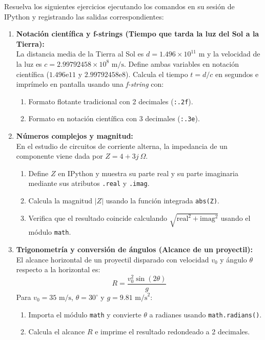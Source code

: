\documentclass[12pt]{article}
\begin{document}
\begin{problemas}[]
	Resuelva los siguientes ejercicios ejecutando los comandos en su sesión de IPython y registrando las salidas correspondientes:

\begin{enumerate}[leftmargin=*]

    \item \textbf{Notación científica y f-strings (Tiempo que tarda la luz del Sol a la Tierra):} \\
    La distancia media de la Tierra al Sol es $d = 1.496 \times 10^{11}\text{ m}$ y la velocidad de la luz es $c = 2.99792458 \times 10^8\text{ m/s}$. 
    Define ambas variables en notación científica ($1.496\text{e}11$ y $2.99792458\text{e}8$). Calcula el tiempo $t = d / c$ en segundos e imprímelo en pantalla usando una \textit{f-string} con:
    \begin{enumerate}
        \item Formato flotante tradicional con 2 decimales (\texttt{:.2f}).
        \item Formato en notación científica con 3 decimales (\texttt{:.3e}).
    \end{enumerate}

    \item \textbf{Números complejos y magnitud:} \\
    En el estudio de circuitos de corriente alterna, la impedancia de un componente viene dada por $Z = 4 + 3j\ \Omega$.
    \begin{enumerate}
        \item Define $Z$ en IPython y muestra su parte real y su parte imaginaria mediante sus atributos \texttt{.real} y \texttt{.imag}.
        \item Calcula la magnitud $|Z|$ usando la función integrada \texttt{abs(Z)}.
        \item Verifica que el resultado coincide calculando $\sqrt{\text{real}^2 + \text{imag}^2}$ usando el módulo \texttt{math}.
    \end{enumerate}

    \item \textbf{Trigonometría y conversión de ángulos (Alcance de un proyectil):} \\
    El alcance horizontal de un proyectil disparado con velocidad $v_0$ y ángulo $\theta$ respecto a la horizontal es:
    \[
    R = \frac{v_0^2 \sin(2\theta)}{g}
    \]
    Para $v_0 = 35\text{ m/s}$, $\theta = 30^\circ$ y $g = 9.81\text{ m/s}^2$:
    \begin{enumerate}
        \item Importa el módulo \texttt{math} y convierte $\theta$ a radianes usando \texttt{math.radians()}.
        \item Calcula el alcance $R$ e imprime el resultado redondeado a 2 decimales.
    \end{enumerate}


\end{enumerate}
\end{problemas}
\end{document}
